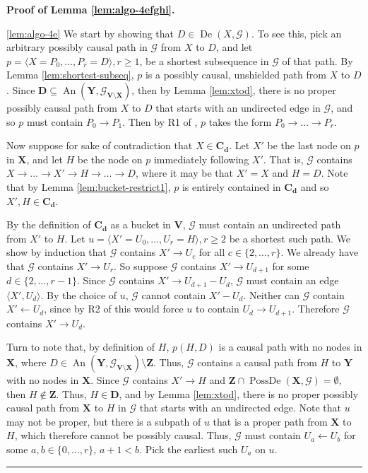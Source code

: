 \documentclass[11pt]{article}
\DeclareMathOperator{\An}{An}
\DeclareMathOperator{\De}{De}
\DeclareMathOperator{\PossDe}{PossDe}
\newcommand{\BlackBox}{\rule{1.5ex}{1.5ex}}  %
\newcommand{\mb}[1]{\mathbf{#1}}
\newcommand{\g}[1][G]{\mathcal{#1}}
\newenvironment{proofof}[1][]{\noindent \textbf{Proof of #1.}}{\hfill\BlackBox}
\begin{document}
\begin{proofof}[Lemma \ref{lem:algo-4efghi}]
    
    \ref{lem:algo-4e}
    We start by showing that $D \in \De(X, \g)$. To see this, pick an arbitrary possibly causal path in $\g$ from $X$ to $D$, and let $p = \langle X=P_0, \dots, P_r=D \rangle, r \ge 1$, be a shortest subsequence in $\g$ of that path. By Lemma \ref{lem:shortest-subseq}, $p$ is a possibly causal, unshielded path from $X$ to $D$. Since $\mb{D} \subseteq \An(\mb{Y}, \g_{\mb{V} \setminus \mb{X}})$, then by Lemma \ref{lem:xtod}, there is no proper possibly causal path from $X$ to $D$ that starts with an undirected edge in $\g$, and so $p$ must contain $P_0 \to P_1$. Then by R1 of \cite{meek1995causal}, $p$ takes the form $P_0 \to \dots \to P_r$. 

    Now suppose for sake of contradiction that $X \in \mb{C_d}$. Let $X'$ be the last node on $p$ in $\mb{X}$, and let $H$ be the node on $p$ immediately following $X'$. That is, $\g$ contains $X \to \dots \to X' \to H \to \dots \to D$, where it may be that $X'=X$ and $H=D$. Note that by Lemma \ref{lem:bucket-restrict1}, $p$ is entirely contained in $\mb{C_d}$ and so $X',H \in \mb{C_d}$. 

    By the definition of $\mb{C_d}$ as a bucket in $\mb{V}$, $\g$ must contain an undirected path from $X'$ to $H$. Let $u= \langle X' = U_0, \dots, U_r=H \rangle, r \ge 2$ be a shortest such path. We show by induction that $\g$ contains $X' \to U_c$ for all $c \in \{2, \dots, r \}$. We already have that $\g$ contains $X' \to U_r$. So suppose $\g$ contains $X' \to U_{d+1}$ for some $d \in \{2, \dots, r-1 \}$. Since $\g$ contains $X' \to U_{d+1} - U_d$, $\g$ must contain an edge $\langle X',U_d \rangle$. By the choice of $u$, $\g$ cannot contain $X' - U_d$. Neither can $\g$ contain $X' \gets U_d$, since by R2 of \cite{meek1995causal} this would force $u$ to contain $U_d \to U_{d+1}$. Therefore $\g$ contains $X' \to U_d$. 
        
    Turn to note that, by definition of $H$, $p(H,D)$ is a causal path with no nodes in $\mb{X}$, where $D \in \An(\mb{Y}, \g_{ \mb{V} \setminus \mb{X} }) \setminus \mb{Z}$. Thus, $\g$ contains a causal path from $H$ to $\mb{Y}$ with no nodes in $\mb{X}$. Since $\g$ contains $X' \to H$ and $\mb{Z} \cap \PossDe(\mb{X}, \g) = \emptyset$, then $H \notin \mb{Z}$. Thus, $H \in \mb{D}$, and by Lemma \ref{lem:xtod}, there is no proper possibly causal path from $\mb{X}$ to $H$ in $\g$ that starts with an undirected edge. Note that $u$ may not be proper, but there is a subpath of $u$ that is a proper path from $\mb{X}$ to $H$, which therefore cannot be possibly causal. Thus, $\g$ must contain $U_a \gets U_b$ for some $a, b \in \{0, \dots, r\}$, $a+1<b$. Pick the earliest such $U_a$ on $u$. 
    

\end{proofof}
\end{document}
